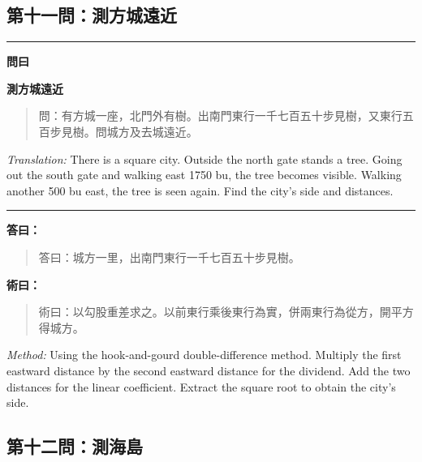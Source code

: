 \documentclass[11pt,a4paper]{article}
\newenvironment{problem}[1][]{%
  \medskip\noindent\rule{\textwidth}{0.4pt}%
  \par\noindent\textbf{\color{sectioncolor}#1}\par\nopagebreak%
  \smallskip%
}{%
  \par\noindent\rule{\textwidth}{0.4pt}\medskip%
}
\newenvironment{answer}{%
  \medskip\noindent{\color{answercolor}\rule{0.5\textwidth}{0.5pt}}%
  \par\color{answercolor}%
}{%
  \par\medskip%
}
\newenvironment{method}{%
  \medskip\noindent{\color{methodcolor}\rule{0.5\textwidth}{0.5pt}}%
  \par\color{methodcolor}%
}{%
  \par\medskip%
}
\begin{document}
\subsection*{第十一問：測方城遠近}

\begin{problem}[\textbf{問曰}]
\textbf{\color{sectioncolor}測方城遠近}

\begin{quote}
\textcolor{chinacolor}{%
問：有方城一座，北門外有樹。出南門東行一千七百五十步見樹，又東行五百步見樹。問城方及去城遠近。
}
\end{quote}

\textit{Translation:} There is a square city. Outside the north gate 
stands a tree. Going out the south gate and walking east 1750 bu, the 
tree becomes visible. Walking another 500 bu east, the tree is seen 
again. Find the city's side and distances.
\end{problem}

\begin{answer}
\textbf{答曰：}

\begin{quote}
\textcolor{chinacolor}{%
答曰：城方一里，出南門東行一千七百五十步見樹。
}
\end{quote}
\end{answer}

\begin{method}
\textbf{術曰：}

\begin{quote}
\textcolor{chinacolor}{%
術曰：以勾股重差求之。以前東行乘後東行為實，併兩東行為從方，開平方得城方。
}
\end{quote}

\textit{Method:} Using the hook-and-gourd double-difference method. 
Multiply the first eastward distance by the second eastward distance 
for the dividend. Add the two distances for the linear coefficient. 
Extract the square root to obtain the city's side.
\end{method}

\subsection*{第十二問：測海島}
\end{document}
